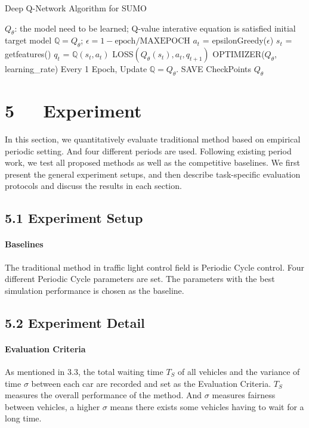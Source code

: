 \documentclass[letterpaper]{article} %
\begin{document}
\begin{algorithm}[h]
	\caption{Deep Q-Network Algorithm for SUMO} %
	\label{alg::conjugateGradient}
	\begin{algorithmic}[1]
		\REQUIRE
		$Q_\theta$: the model need to be learned;
		\ENSURE
		Q-value interative equation is satisfied
		\STATE initial target model $\mathbb{Q}=Q_\theta$;
		\STATE $\epsilon=1-\text{epoch}/\text{MAXEPOCH}$
		\STATE $a_t$ = epsilonGreedy($\epsilon$)
		\STATE $s_t$ = getfeatures()
		\STATE $q_t$ = $\mathbb{Q}(s_t, a_t)$
		\ENDWHILE
		\STATE LOSS$\left(Q_\theta(s_t), a_t, q_{t+1}\right)$
		\STATE OPTIMIZER($Q_\theta$, learning\_rate)
		\ENDFOR
		\ENDFOR
		\STATE Every 1 Epoch, Update $\mathbb{Q}=Q_\theta$.
		\STATE SAVE CheckPoints $Q_\theta$
		\ENDFOR
	\end{algorithmic}
\end{algorithm}
\newpage

\section{5\ \ \ Experiment}
\hspace*{1em}In this section, we quantitatively evaluate traditional method based on empirical periodic setting. And four different periods are used. Following existing period work, we test all proposed methods as well as the competitive baselines. We first present the general experiment setups, and then describe task-specific evaluation protocols and discuss the results in each section.
\subsection{5.1 Experiment Setup}
\paragraph{Baselines} The traditional method in traffic light control field is Periodic Cycle control. Four different Periodic Cycle parameters are set. The parameters with the best simulation performance is chosen as the baseline. 
\subsection{5.2 Experiment Detail}
\paragraph{Evaluation Criteria} As mentioned in $3.3$, the total waiting time $T_S$ of all vehicles and the variance of time $\sigma$ between each car are recorded and set as the Evaluation Criteria. $T_S$ measures the overall performance of the method. And $\sigma$ measures fairness between vehicles, a higher $\sigma$ means there exists some vehicles having to wait for a long time.
\end{document}
